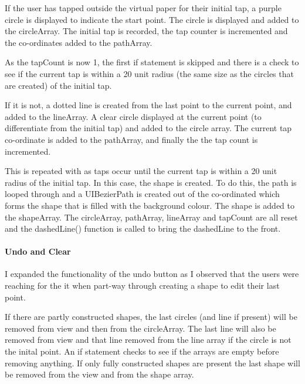 \documentclass[11pt]{article}
\begin{document}
                 If the user has tapped outside the virtual paper for their initial tap, a purple circle is displayed to indicate the start point. The circle is displayed and added to the circleArray. The initial tap is recorded, the tap counter is incremented and the co-ordinates added to the pathArray. 
                 
                 As the tapCount is now 1, the first if statement is skipped and there is a check to see if the current tap is within a 20 unit radius (the same size as the circles that are created) of the initial tap. 
                 
                 If it is not, a dotted line is created from the last point to the current point, and added to the lineArray. A clear circle displayed at the current point (to differentiate from the initial tap) and added to the circle array. The current tap co-ordinate is added to the pathArray, and finally the the tap count is incremented.
                 
                 This is repeated with as taps occur until the current tap is within a 20 unit radius of the initial tap. In this case, the shape is created. To do this, the path is looped through and a UIBezierPath is created out of the co-ordinated which forms the shape that is filled with the background colour. The shape is added to the shapeArray. The circleArray, pathArray, lineArray and tapCount are all reset and the dashedLine() function is called to bring the dashedLine to the front. 

            
             \paragraph{Undo and Clear}
              I expanded the functionality of the undo button as I observed that the users were reaching for the it when part-way through creating a shape to edit their last point. 
              
              If there are partly constructed shapes, the last circles (and line if present) will be removed from view and then from the circleArray. The last line will also be removed from view and that line removed from the line array if the circle is not the inital point. An if statement checks to see if the arrays are empty before removing anything.
              If only fully constructed shapes are present the last shape will be removed from the view and from the shape array. 
              
\end{document}
